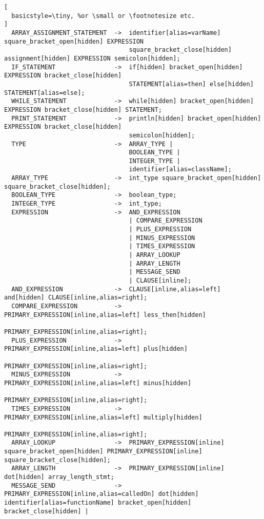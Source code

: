 \begin{lstlisting}[
  basicstyle=\tiny, %or \small or \footnotesize etc.
]
  ARRAY_ASSIGNMENT_STATEMENT  ->  identifier[alias=varName] square_bracket_open[hidden] EXPRESSION 
                                  square_bracket_close[hidden] assignment[hidden] EXPRESSION semicolon[hidden];
  IF_STATEMENT                ->  if[hidden] bracket_open[hidden] EXPRESSION bracket_close[hidden] 
                                  STATEMENT[alias=then] else[hidden] STATEMENT[alias=else];
  WHILE_STATEMENT             ->  while[hidden] bracket_open[hidden] EXPRESSION bracket_close[hidden] STATEMENT;
  PRINT_STATEMENT             ->  println[hidden] bracket_open[hidden] EXPRESSION bracket_close[hidden] 
                                  semicolon[hidden];
  TYPE                        ->  ARRAY_TYPE | 
                                  BOOLEAN_TYPE | 
                                  INTEGER_TYPE | 
                                  identifier[alias=className];
  ARRAY_TYPE                  ->  int_type square_bracket_open[hidden] square_bracket_close[hidden];
  BOOLEAN_TYPE                ->  boolean_type;
  INTEGER_TYPE                ->  int_type;
  EXPRESSION                  ->  AND_EXPRESSION
                                  | COMPARE_EXPRESSION
                                  | PLUS_EXPRESSION
                                  | MINUS_EXPRESSION
                                  | TIMES_EXPRESSION
                                  | ARRAY_LOOKUP
                                  | ARRAY_LENGTH
                                  | MESSAGE_SEND
                                  | CLAUSE[inline];
  AND_EXPRESSION              ->  CLAUSE[inline,alias=left] and[hidden] CLAUSE[inline,alias=right];
  COMPARE_EXPRESSION          ->  PRIMARY_EXPRESSION[inline,alias=left] less_then[hidden] 
                                  PRIMARY_EXPRESSION[inline,alias=right];
  PLUS_EXPRESSION             ->  PRIMARY_EXPRESSION[inline,alias=left] plus[hidden] 
                                  PRIMARY_EXPRESSION[inline,alias=right];
  MINUS_EXPRESSION            ->  PRIMARY_EXPRESSION[inline,alias=left] minus[hidden] 
                                  PRIMARY_EXPRESSION[inline,alias=right];
  TIMES_EXPRESSION            ->  PRIMARY_EXPRESSION[inline,alias=left] multiply[hidden] 
                                  PRIMARY_EXPRESSION[inline,alias=right];
  ARRAY_LOOKUP                ->  PRIMARY_EXPRESSION[inline] square_bracket_open[hidden] PRIMARY_EXPRESSION[inline] square_bracket_close[hidden];
  ARRAY_LENGTH                ->  PRIMARY_EXPRESSION[inline] dot[hidden] array_length_stmt;
  MESSAGE_SEND                ->  PRIMARY_EXPRESSION[inline,alias=calledOn] dot[hidden] identifier[alias=functionName] bracket_open[hidden] bracket_close[hidden] |

\end{lstlisting}
